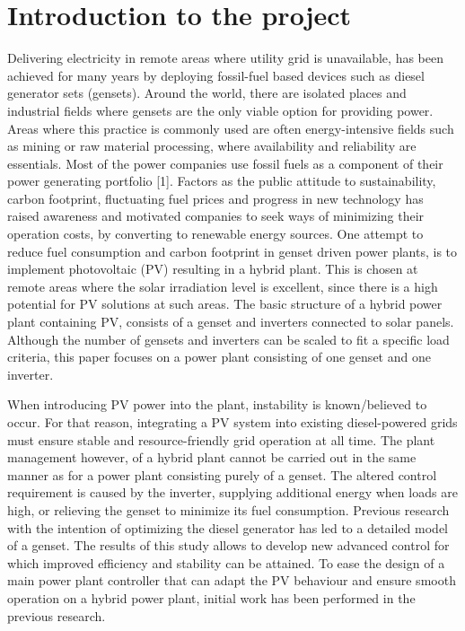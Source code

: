 
\section{Introduction to the project}
\label{intro}

Delivering electricity in remote areas where utility grid is unavailable, has been achieved for many years by deploying fossil-fuel based devices such as diesel generator sets (gensets). Around the world, there are isolated places and industrial fields where gensets are the only viable option for providing power. Areas where this practice is commonly used are often energy-intensive fields such as mining or raw material processing, where availability and reliability are essentials. Most of the power companies use fossil fuels as a component of their power generating portfolio [1]. Factors as the public attitude to sustainability, carbon footprint, fluctuating fuel prices and progress in new technology has raised awareness and motivated companies to seek ways of minimizing their operation costs, by converting to renewable energy sources. One attempt to reduce fuel consumption and carbon footprint in genset driven power plants, is to implement photovoltaic (PV) resulting in a hybrid plant. This is chosen at remote areas where the solar irradiation level is excellent, since there is a high potential for PV solutions at such areas. The basic structure of a hybrid power plant containing PV, consists of a genset and inverters connected to solar panels. Although the number of gensets and inverters can be scaled to fit a specific load criteria, this paper focuses on a power plant consisting of one genset and one inverter.

When introducing PV power into the plant, instability is known/believed to occur. For that reason, integrating a PV system into existing diesel-powered grids must ensure stable and resource-friendly grid operation at all time. The plant management however, of a hybrid plant cannot be carried out in the same manner as for a power plant consisting purely of a genset. The altered control requirement is caused by the inverter, supplying additional energy when loads are high, or relieving the genset to minimize its fuel consumption. Previous research with the intention of optimizing the diesel generator has led to a detailed model of a genset. The results of this study allows to develop new advanced control for which improved efficiency and stability can be attained. To ease the design of a main power plant controller that can adapt the PV behaviour and ensure smooth operation on a hybrid power plant, initial work has been performed in the previous research.

